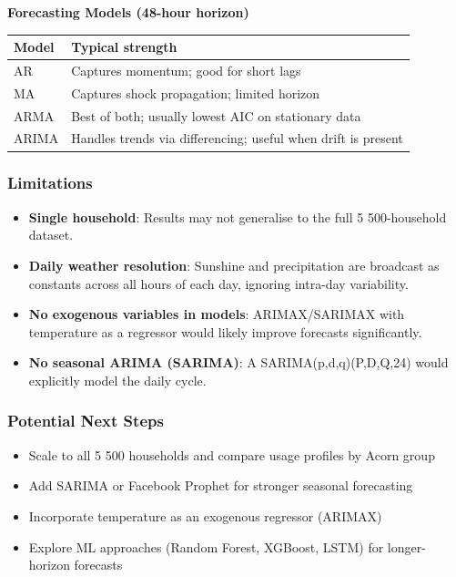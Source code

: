 \documentclass[11pt]{article}
\providecommand{\tightlist}{%
      \setlength{\itemsep}{0pt}\setlength{\parskip}{0pt}}
\begin{document}
\textbf{Forecasting Models (48-hour horizon)}

{\def\LTcaptype{none} %
\begin{longtable}[]{@{}
  >{\raggedright\arraybackslash}p{}
  >{\raggedright\arraybackslash}p{}@{}}
\toprule\noalign{}
\begin{minipage}[b]{\linewidth}\raggedright
Model
\end{minipage} & \begin{minipage}[b]{\linewidth}\raggedright
Typical strength
\end{minipage} \\
\midrule\noalign{}
\endhead
\bottomrule\noalign{}
\endlastfoot
AR & Captures momentum; good for short lags \\
MA & Captures shock propagation; limited horizon \\
ARMA & Best of both; usually lowest AIC on stationary data \\
ARIMA & Handles trends via differencing; useful when drift is present \\
\end{longtable}
}

\subsubsection{Limitations}\label{limitations}

\begin{itemize}
\tightlist
\item
  \textbf{Single household}: Results may not generalise to the full 5
  500-household dataset.
\item
  \textbf{Daily weather resolution}: Sunshine and precipitation are
  broadcast as constants across all hours of each day, ignoring
  intra-day variability.
\item
  \textbf{No exogenous variables in models}: ARIMAX/SARIMAX with
  temperature as a regressor would likely improve forecasts
  significantly.
\item
  \textbf{No seasonal ARIMA (SARIMA)}: A SARIMA(p,d,q)(P,D,Q,24) would
  explicitly model the daily cycle.
\end{itemize}

\subsubsection{Potential Next Steps}\label{potential-next-steps}

\begin{itemize}
\tightlist
\item
  Scale to all 5 500 households and compare usage profiles by Acorn
  group
\item
  Add SARIMA or Facebook Prophet for stronger seasonal forecasting
\item
  Incorporate temperature as an exogenous regressor (ARIMAX)
\item
  Explore ML approaches (Random Forest, XGBoost, LSTM) for
  longer-horizon forecasts
\end{itemize}


    
    
    
\end{document}

